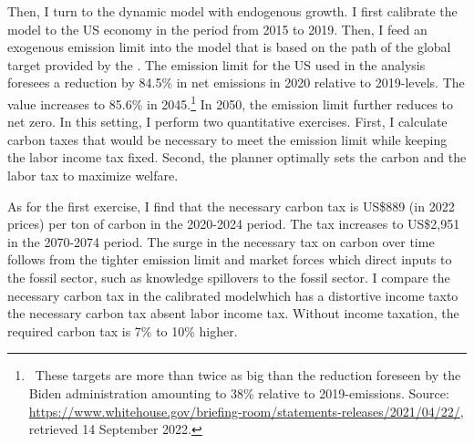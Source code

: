 Then, I turn to the dynamic model with endogenous growth. I first calibrate the model to the US economy in the period from 2015 to 2019. Then, I feed an exogenous emission limit into the model that is based on the path of the global target provided by the \cite{IPCC2022}. The emission limit for the US used in the analysis foresees a reduction by 84.5\% in net emissions  in 2020 relative to 2019-levels. The value increases to 85.6\% in 2045.\footnote{\  These targets are more than twice as big than the reduction foreseen by the Biden administration amounting to 38\% relative to 2019-emissions. Source:  \href{https://www.whitehouse.gov/briefing-room/statements-releases/2021/04/22/fact-sheet-president-biden-sets-2030-greenhouse-gas-pollution-reduction-target-aimed-at-creating-good-paying-union-jobs-and-securing-u-s-leadership-on-clean-energy-technologies/}{https://www.whitehouse.gov/briefing-room/statements-releases/2021/04/22/}, retrieved 14 September 2022.} In 2050, the emission limit further reduces to net zero.
In this setting, I perform two quantitative exercises. First, I calculate carbon taxes that would be necessary to meet the emission limit while keeping the labor income tax fixed. Second,  the planner optimally sets the carbon and the labor tax to maximize welfare.

As for the first exercise, I find that the necessary carbon tax is US\$889 (in 2022 prices) per ton of carbon in the 2020-2024 period. The tax increases to US\$2,951 in the 2070-2074 period. %
The surge in the necessary tax on carbon over time follows from the tighter emission limit and market forces which direct inputs to the fossil sector, such as knowledge spillovers to the fossil sector. I compare the necessary carbon tax in the calibrated model\textemdash which has a distortive income tax\textemdash to the necessary carbon tax absent labor income tax. Without income taxation, the required carbon tax is  7\% to 10\% higher.

